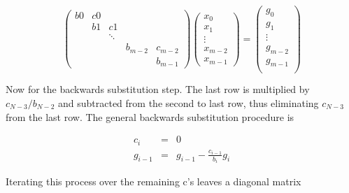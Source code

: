 \documentclass{article}
\begin{document}
\begin{equation}
\label{eqn: mat system}
\left( \begin{array}{ccccc}
    b0 & c0 &        &         &         \\
	   & b1 &  c1    &         &         \\
	   &    & \ddots &         &         \\
	   &	    &        & b_{m-2} & c_{m-2} \\
	   &    &        &         & b_{m-1}
   \end{array} \right)
\left( \begin{array}{c}
	x_0     \\
	x_1     \\
	\vdots  \\
	x_{m-2} \\
	x_{m-1}
   \end{array} \right)
=
\left( \begin{array}{c}
	g_0     \\
	g_1     \\
	\vdots  \\
	g_{m-2} \\
	g_{m-1} \\
   \end{array} \right)
\end{equation}

Now for the backwards substitution step.  The last row is multiplied by $c_{N-3}/b_{N-2}$ and subtracted from the second to last row, thus eliminating $c_{N-3}$ from the last row.  The general backwards substitution procedure is 

\begin{equation}
\begin{aligned}
	c_i &=& 0                                    \\
	g_{i-1} &=& g_{i-1} - \frac{c_{i-1}}{b_i}g_i
\end{aligned}
\end{equation}

Iterating this process over the remaining c’s leaves a diagonal matrix
\end{document}
